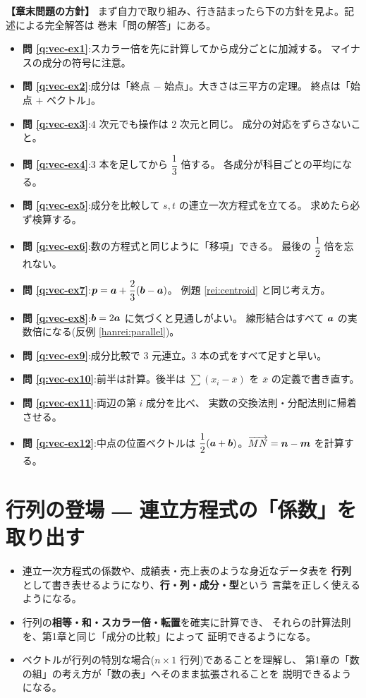 \bigskip
{\small
\noindent\textbf{【章末問題の方針】}\quad
まず自力で取り組み、行き詰まったら下の方針を見よ。記述による完全解答は
巻末「問の解答」にある。
\begin{itemize}
\item \textbf{問 \ref{q:vec-ex1}}:スカラー倍を先に計算してから成分ごとに加減する。
マイナスの成分の符号に注意。
\item \textbf{問 \ref{q:vec-ex2}}:成分は「終点 $-$ 始点」。大きさは三平方の定理。
終点は「始点 $+$ ベクトル」。
\item \textbf{問 \ref{q:vec-ex3}}:$4$ 次元でも操作は $2$ 次元と同じ。
成分の対応をずらさないこと。
\item \textbf{問 \ref{q:vec-ex4}}:$3$ 本を足してから $\dfrac{1}{3}$ 倍する。
各成分が科目ごとの平均になる。
\item \textbf{問 \ref{q:vec-ex5}}:成分を比較して $s, t$ の連立一次方程式を立てる。
求めたら必ず検算する。
\item \textbf{問 \ref{q:vec-ex6}}:数の方程式と同じように「移項」できる。
最後の $\dfrac{1}{2}$ 倍を忘れない。
\item \textbf{問 \ref{q:vec-ex7}}:$\bm{p} = \bm{a} + \dfrac{2}{3}(\bm{b} - \bm{a})$。
例題 \ref{rei:centroid} と同じ考え方。
\item \textbf{問 \ref{q:vec-ex8}}:$\bm{b} = 2\bm{a}$ に気づくと見通しがよい。
線形結合はすべて $\bm{a}$ の実数倍になる(反例 \ref{hanrei:parallel})。
\item \textbf{問 \ref{q:vec-ex9}}:成分比較で $3$ 元連立。$3$ 本の式をすべて足すと早い。
\item \textbf{問 \ref{q:vec-ex10}}:前半は計算。後半は
$\sum (x_i - \bar{x})$ を $\bar{x}$ の定義で書き直す。
\item \textbf{問 \ref{q:vec-ex11}}:両辺の第 $i$ 成分を比べ、
実数の交換法則・分配法則に帰着させる。
\item \textbf{問 \ref{q:vec-ex12}}:中点の位置ベクトルは
$\dfrac{1}{2}(\bm{a} + \bm{b})$。$\overrightarrow{MN} = \bm{n} - \bm{m}$
を計算する。
\end{itemize}
}

\chapter{行列の登場 ― 連立方程式の「係数」を取り出す}

\begin{goal}
\begin{itemize}
\item 連立一次方程式の係数や、成績表・売上表のような身近なデータ表を
\textbf{行列}として書き表せるようになり、\textbf{行・列・成分・型}という
言葉を正しく使えるようになる。
\item 行列の\textbf{相等・和・スカラー倍・転置}を確実に計算でき、
それらの計算法則を、第1章と同じ「成分の比較」によって
証明できるようになる。
\item ベクトルが行列の特別な場合($n \times 1$ 行列)であることを理解し、
第1章の「数の組」の考え方が「数の表」へそのまま拡張されることを
説明できるようになる。
\end{itemize}
\end{goal}

